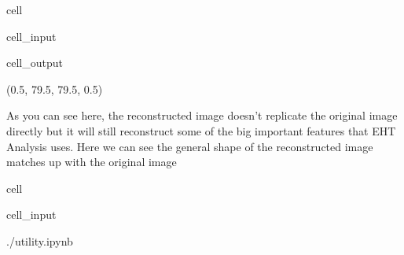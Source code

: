 \documentclass[letterpaper,10pt,english]{jupyterBook}
\begin{document}
\begin{sphinxuseclass}{cell}\begin{sphinxVerbatimInput}

\begin{sphinxuseclass}{cell_input}
\begin{sphinxVerbatim}[commandchars=\\\{\}]
  
\end{sphinxVerbatim}

\end{sphinxuseclass}\end{sphinxVerbatimInput}
\begin{sphinxVerbatimOutput}

\begin{sphinxuseclass}{cell_output}
\begin{sphinxVerbatim}[commandchars=\\\{\}]
(\PYGZhy{}0.5, 79.5, 79.5, \PYGZhy{}0.5)
\end{sphinxVerbatim}

\noindent{}

\end{sphinxuseclass}\end{sphinxVerbatimOutput}

\end{sphinxuseclass}
\sphinxAtStartPar
As you can see here, the reconstructed image doesn’t replicate the original image directly but it will still reconstruct some of the big important features that EHT Analysis uses. Here we can see the general shape of the reconstructed image matches up with the original image

\sphinxstepscope

\begin{sphinxuseclass}{cell}\begin{sphinxVerbatimInput}

\begin{sphinxuseclass}{cell_input}
\begin{sphinxVerbatim}[commandchars=\\\{\}]
 ./utility.ipynb
\end{sphinxVerbatim}

\end{sphinxuseclass}\end{sphinxVerbatimInput}

\end{sphinxuseclass}
\end{document}
